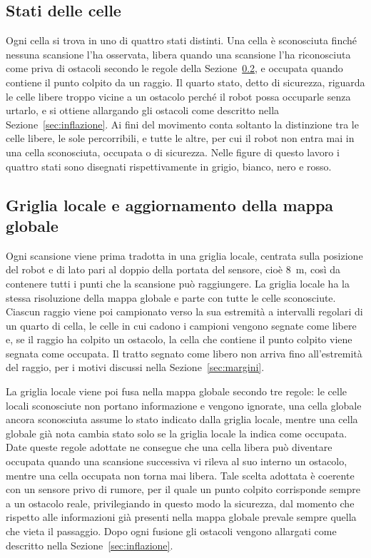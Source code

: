 \subsection{Stati delle celle}
\label{sec:stati}

Ogni cella si trova in uno di quattro stati distinti. Una cella è sconosciuta finché nessuna scansione l'ha osservata, libera quando una scansione l'ha riconosciuta come priva di ostacoli secondo le regole della Sezione~\ref{sec:aggiornamento}, e occupata quando contiene il punto colpito da un raggio. Il quarto stato, detto di sicurezza, riguarda le celle libere troppo vicine a un ostacolo perché il robot possa occuparle senza urtarlo, e si ottiene allargando gli ostacoli come descritto nella Sezione~\ref{sec:inflazione}. Ai fini del movimento conta soltanto la distinzione tra le celle libere, le sole percorribili, e tutte le altre, per cui il robot non entra mai in una cella sconosciuta, occupata o di sicurezza. Nelle figure di questo lavoro i quattro stati sono disegnati rispettivamente in grigio, bianco, nero e rosso.

\subsection{Griglia locale e aggiornamento della mappa globale}
\label{sec:aggiornamento}

Ogni scansione viene prima tradotta in una griglia locale, centrata sulla posizione del robot e di lato pari al doppio della portata del sensore, cioè 8~m, così da contenere tutti i punti che la scansione può raggiungere. La griglia locale ha la stessa risoluzione della mappa globale e parte con tutte le celle sconosciute. Ciascun raggio viene poi campionato verso la sua estremità a intervalli regolari di un quarto di cella, le celle in cui cadono i campioni vengono segnate come libere e, se il raggio ha colpito un ostacolo, la cella che contiene il punto colpito viene segnata come occupata. Il tratto segnato come libero non arriva fino all'estremità del raggio, per i motivi discussi nella Sezione~\ref{sec:margini}.

La griglia locale viene poi fusa nella mappa globale secondo tre regole: le celle locali sconosciute non portano informazione e vengono ignorate, una cella globale ancora sconosciuta assume lo stato indicato dalla griglia locale, mentre una cella globale già nota cambia stato solo se la griglia locale la indica come occupata. Date queste regole adottate ne consegue che una cella libera può diventare occupata quando una scansione successiva vi rileva al suo interno un ostacolo, mentre una cella occupata non torna mai libera. Tale scelta adottata è coerente con un sensore privo di rumore, per il quale un punto colpito corrisponde sempre a un ostacolo reale, privilegiando in questo modo la sicurezza, dal momento che rispetto alle informazioni già presenti nella mappa globale prevale sempre quella che vieta il passaggio. Dopo ogni fusione gli ostacoli vengono allargati come descritto nella Sezione~\ref{sec:inflazione}.

